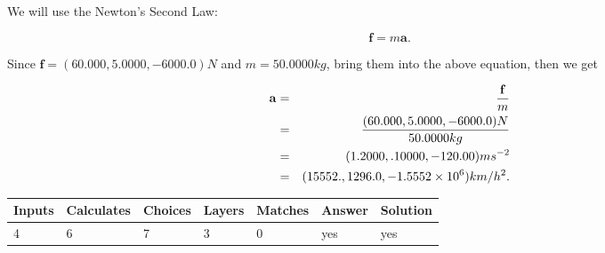 \documentclass[12pt]{article}
\begin{document}
 
\noindent{}
 
 
 
 
 
 
\noindent{}
 
 

We will use the Newton's Second Law:
 
\[
\mathbf{f}=m\mathbf{a}.
\]
 
Since $\mathbf{f}=( %
60.000,  %
5.0000,  %
-6000.0 )N$
and $m= %
50.0000kg$, bring them into the above equation, then we get
 
\begin{eqnarray*}
\mathbf{a}&=&\frac{\mathbf{f}}m  \\
&=&\frac{(
60.000 ,
5.0000 ,
-6000.0 )N
}{ %
50.0000 kg}  \\
&=&(
1.2000 ,
.10000,
-120.00
)ms^{-2} \\
&=&(
15552. ,
1296.0 ,
-1.5552 \times 10^{6}
)km/h^2.
\end{eqnarray*}
 
 
 
\noindent{}
 
 

 
\vspace{0.3in}
   
   
   
   
\noindent\begin{tabular}{|l|l|l|l|l|l|l|}
 \hline
Inputs & Calculates & Choices & Layers & Matches & Answer & Solution \\ \hline
           4 & 
           6 & 
           7
  & 
           3 & 
           0 & 
  yes & 
  yes 
  \\ \hline
 \end{tabular}
   
   
   
   
\noindent{}
   
   
  
\end{document}
